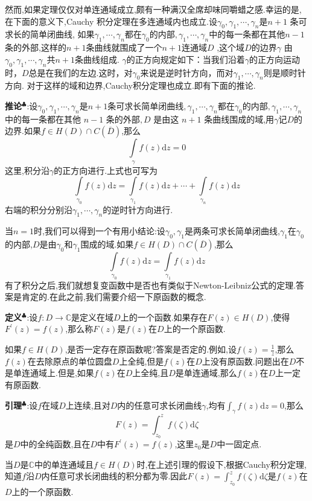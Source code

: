 然而,如果定理仅仅对单连通域成立,颇有一种满汉全席却味同嚼蜡之感.幸运的是,在下面的意义下,Cauchy 积分定理在多连通域内也成立.设$\gamma_0,\gamma_1,\cdots,\gamma_n$是$n+1$ 条可求长的简单闭曲线,
如果$\gamma_1,\cdots,\gamma_n$都在$\gamma_0$的内部$,\gamma_1,\cdots,\gamma_n$中的每一条都在其他$n-1$条的外部,这样的$n+1$条曲线就围成了一个$n+1$连通域$D$ ,这个域$D$的边界$\gamma$ 由$\gamma_0,\gamma_1,\cdots,\gamma_n$共$n+1$条曲线组成.
 $\gamma$的正方向规定如下：当我们沿着$\gamma$的正方向运动时，$D$总是在我们的左边.这时，对$\gamma_0$来说是逆时针方向，而对$\gamma_1,\cdots,\gamma_n$则是顺时针方向. 对于这样的域和边界,Cauchy积分定理也成立.即有下面的推论.\par
\textbf{推论}$^\clubsuit $:设$\gamma_0,\gamma_1,\cdots,\gamma_n$是$n+1$条可求长简单闭曲线$,\gamma_1,\cdots,\gamma_n$都在$\gamma_0$的内部$,\gamma_1,\cdots,\gamma_n$ 中的每一条都在其他 $n-1$ 条的外部$,D$ 是由这 $n+1$ 条曲线围成的域,用$\gamma$记$D$的边界.如果$f\in H(D)\cap C(\overline{D})$,那么
$$
\int\limits_{\gamma}f(z)\mathrm{d}z=0
$$
这里,积分沿$\gamma$的正方向进行.上式也可写为
$$
\int\limits_{\gamma_0}f(z)\mathrm{d}z=\int\limits_{\gamma_1}f(z)\mathrm{d}z+\cdots+\int\limits_{\gamma_n}f(z)\mathrm{d}z
$$
右端的积分分别沿$\gamma_1,\cdots,\gamma_n$的逆时针方向进行.\par
当$n=1$时,我们可以得到一个有用小结论:设$\gamma_0,\gamma_1$是两条可求长简单闭曲线,$\gamma_1$在$\gamma_0$的内部,$D$是由$\gamma_0$和$\gamma_1$围成的域.如果$f\in H(D)\cap C(\overline{D})$,那么
$$
\int\limits_{\gamma_0}f(z)\mathrm{d}z=\int\limits_{\gamma_1}f(z)\mathrm{d}z
$$
\quad \quad 有了积分之后,我们就想复变函数中是否也有类似于Newton-Leibniz公式的定理.答案是肯定的.在此之前,我们需要介绍一下原函数的概念.\par
\textbf{定义}$^{\clubsuit}$:设$f:D\to \mathbb{C}$是定义在域$D$上的一个函数.如果存在$F(z)\in H(D)$,使得$F^{\prime}(z)=f(z)$,那么称$F(z)$是$f(z)$在$D$上的一个原函数.\par
如果$f\in H(D)$,是否一定存在原函数呢?答案是否定的.例如,设$f(z)=\frac{1}{z}$,那么$f(z)$在去除原点的单位圆盘$D$上全纯,但是$f(z)$在$D$上没有原函数.问题出在$D$不是单连通域上.但是,如果$f(z)$在$D$上全纯,且$D$是单连通域,那么$f(z)$在$D$上一定有原函数.\par
\textbf{引理}$^\clubsuit$:设$f$在域$D$上连续,且对$D$内的任意可求长闭曲线$\gamma$,均有$\int_{\gamma}f(z)\mathrm{d}z=0$,那么
$$
F(z)=\int_{z_0}^zf(\zeta)\mathrm{d}\zeta
$$
是$D$中的全纯函数,且在$D$中有$F^{\prime}(z)=f(z)$,这里$z_0$是$D$中一固定点.\par
当$D$是$\mathbb{C}$中的单连通域且$f\in H(D)$时,在上述引理的假设下,根据Cauchy积分定理,知道$f$沿$D$内任意可求长闭曲线的积分都为零.因此$F(z)=\int_{z_0}^zf(\zeta)\mathrm{d}\zeta$是$f(z)$在$D$上的一个原函数.\par
